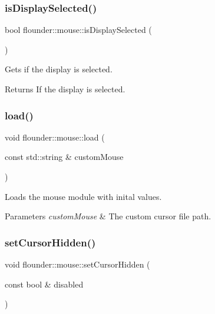 \subsubsection{\texorpdfstring{is\+Display\+Selected()}{isDisplaySelected()}}
{\footnotesize\ttfamily bool flounder\+::mouse\+::is\+Display\+Selected (\begin{DoxyParamCaption}{ }\end{DoxyParamCaption})}



Gets if the display is selected. 

\begin{DoxyReturn}{Returns}
If the display is selected. 
\end{DoxyReturn}
\mbox{\label{classflounder_1_1mouse_af88cf24fffafeb3e6ed1db19ec40698c}} 
\subsubsection{\texorpdfstring{load()}{load()}}
{\footnotesize\ttfamily void flounder\+::mouse\+::load (\begin{DoxyParamCaption}\item[{const std\+::string \&}]{custom\+Mouse }\end{DoxyParamCaption})}



Loads the mouse module with inital values. 


\begin{DoxyParams}{Parameters}
{\em custom\+Mouse} & The custom cursor file path. \\
\hline
\end{DoxyParams}
\mbox{\label{classflounder_1_1mouse_aff9750c7d68e93aea4c2d3c447677a9e}} 
\subsubsection{\texorpdfstring{set\+Cursor\+Hidden()}{setCursorHidden()}}
{\footnotesize\ttfamily void flounder\+::mouse\+::set\+Cursor\+Hidden (\begin{DoxyParamCaption}\item[{const bool \&}]{disabled }\end{DoxyParamCaption})}



